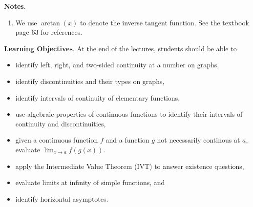 \documentclass[../main]{subfiles}
\begin{document}
%
%
\textbf{Notes}.
\begin{enumerate}
  \item We use \(\arctan(x)\) to denote the inverse tangent function.  See the textbook page 63 for references.
\end{enumerate}


%
%
\textbf{Learning Objectives}.
At the end of the lectures, students should be able to
\begin{itemize}
  \item identify left, right, and two-sided continuity at a number on graphs,
  \item identify discontinuities and their types on graphs,
  \item identify intervals of continuity of elementary functions,
  \item use algebraic properties of continuous functions to identify their intervals of continuity and discontinuities,
  \item given a continuous function \(f\) and a function \(g\) not necessarily continous at \(a\), evaluate \(\lim_{x \to a} f(g(x))\).
  \item apply the Intermediate Value Theorem (IVT) to answer existence questions,
  \item evaluate limits at infinity of simple functions, and
  \item identify horizontal asymptotes.
\end{itemize}
\clearpage

%
%
\end{document}
